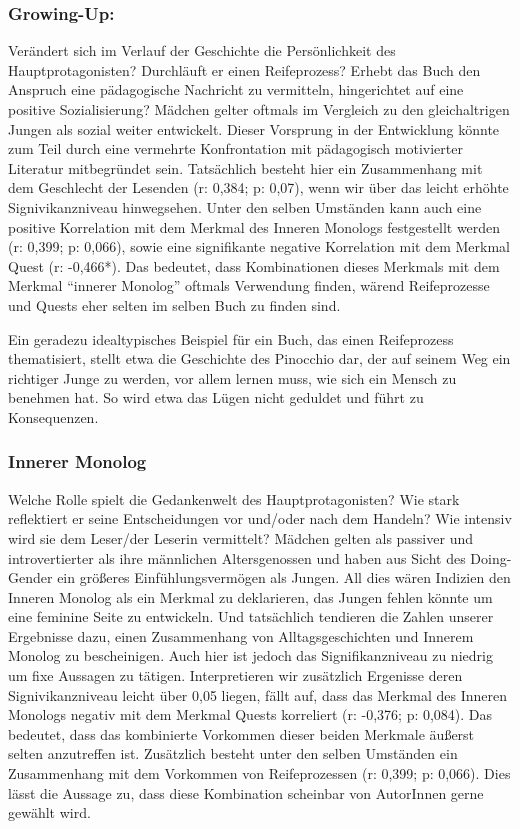 \subsubsection{Growing-Up:}

Verändert sich im Verlauf der Geschichte die Persönlichkeit des
Hauptprotagonisten? Durchläuft er einen Reifeprozess? Erhebt das Buch
den Anspruch eine pädagogische Nachricht zu vermitteln, hingerichtet auf
eine positive Sozialisierung? Mädchen gelter oftmals im Vergleich zu den
gleichaltrigen Jungen als sozial weiter entwickelt. Dieser Vorsprung in
der Entwicklung könnte zum Teil durch eine vermehrte Konfrontation mit
pädagogisch motivierter Literatur mitbegründet sein. Tatsächlich besteht
hier ein Zusammenhang mit dem Geschlecht der Lesenden (r: 0,384; p:
0,07), wenn wir über das leicht erhöhte Signivikanzniveau hinwegsehen.
Unter den selben Umständen kann auch eine positive Korrelation mit dem
Merkmal des Inneren Monologs festgestellt werden (r: 0,399; p: 0,066),
sowie eine signifikante negative Korrelation mit dem Merkmal Quest (r:
-0,466*). Das bedeutet, dass Kombinationen dieses Merkmals mit dem
Merkmal ``innerer Monolog'' oftmals Verwendung finden, wärend
Reifeprozesse und Quests eher selten im selben Buch zu finden sind.

Ein geradezu idealtypisches Beispiel für ein Buch, das einen
Reifeprozess thematisiert, stellt etwa die Geschichte des Pinocchio dar,
der auf seinem Weg ein richtiger Junge zu werden, vor allem lernen muss,
wie sich ein Mensch zu benehmen hat. So wird etwa das Lügen nicht
geduldet und führt zu Konsequenzen.

\subsubsection{Innerer Monolog}

Welche Rolle spielt die Gedankenwelt des Hauptprotagonisten? Wie stark
reflektiert er seine Entscheidungen vor und/oder nach dem Handeln? Wie
intensiv wird sie dem Leser/der Leserin vermittelt? Mädchen gelten als
passiver und introvertierter als ihre männlichen Altersgenossen und
haben aus Sicht des Doing-Gender ein größeres Einfühlungsvermögen als
Jungen. All dies wären Indizien den Inneren Monolog als ein Merkmal zu
deklarieren, das Jungen fehlen könnte um eine feminine Seite zu
entwickeln. Und tatsächlich tendieren die Zahlen unserer Ergebnisse
dazu, einen Zusammenhang von Alltagsgeschichten und Innerem Monolog zu
bescheinigen. Auch hier ist jedoch das Signifikanzniveau zu niedrig um
fixe Aussagen zu tätigen. Interpretieren wir zusätzlich Ergenisse deren
Signivikanzniveau leicht über 0,05 liegen, fällt auf, dass das Merkmal
des Inneren Monologs negativ mit dem Merkmal Quests korreliert (r:
-0,376; p: 0,084). Das bedeutet, dass das kombinierte Vorkommen dieser
beiden Merkmale äußerst selten anzutreffen ist. Zusätzlich besteht unter
den selben Umständen ein Zusammenhang mit dem Vorkommen von
Reifeprozessen (r: 0,399; p: 0,066). Dies lässt die Aussage zu, dass
diese Kombination scheinbar von AutorInnen gerne gewählt wird.

